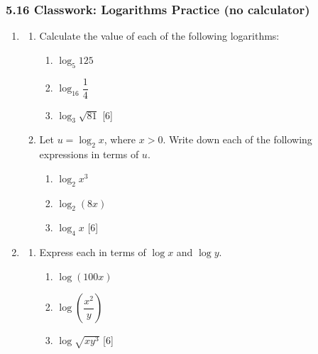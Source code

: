 \documentclass[12pt, twoside]{article}
\begin{document}
\subsubsection*{5.16 Classwork: Logarithms Practice (no calculator)}

\begin{enumerate}[itemsep=0.15cm]

\item[1.] [Maximum mark: 12]

\begin{enumerate}[itemsep=0.2cm]
  \item Calculate the value of each of the following logarithms:
  \begin{enumerate}[itemsep=0.1cm, label=(\roman*)]
    \item $\log_5 125$
    \item $\log_{16} \dfrac{1}{4}$
    \item $\log_3 \sqrt{81}$ \hfill [6]
  \end{enumerate}

  \item Let $u = \log_2 x$, where $x > 0$. Write down each of the
  following expressions in terms of $u$.
  \begin{enumerate}[itemsep=0.1cm, label=(\roman*)]
    \item $\log_2 x^3$
    \item $\log_2(8x)$
    \item $\log_4 x$ \hfill [6]
  \end{enumerate}
\end{enumerate}


\newpage

\item[2.] [Maximum mark: 12]

\begin{enumerate}[itemsep=0.2cm]
  \item Express each in terms of $\log x$ and $\log y$.
  \begin{enumerate}[itemsep=0.1cm, label=(\roman*)]
    \item $\log (100x)$
    \item $\log \!\left(\dfrac{x^2}{y}\right)$
    \item $\log \sqrt{xy^3}$ \hfill [6]
  \end{enumerate}


\end{enumerate}
\end{enumerate}
\end{document}
